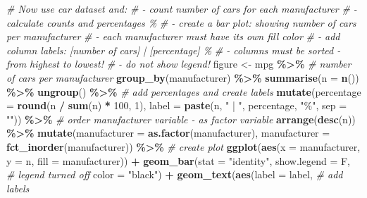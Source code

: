 \documentclass[
]{article}
\newenvironment{Shaded}{\begin{snugshade}}{\end{snugshade}}
\newcommand{\AttributeTok}[1]{\textcolor[rgb]{0.13,0.29,0.53}{#1}}
\newcommand{\CommentTok}[1]{\textcolor[rgb]{0.56,0.35,0.01}{\textit{#1}}}
\newcommand{\DecValTok}[1]{\textcolor[rgb]{0.00,0.00,0.81}{#1}}
\newcommand{\FunctionTok}[1]{\textcolor[rgb]{0.13,0.29,0.53}{\textbf{#1}}}
\newcommand{\NormalTok}[1]{#1}
\newcommand{\OtherTok}[1]{\textcolor[rgb]{0.56,0.35,0.01}{#1}}
\newcommand{\SpecialCharTok}[1]{\textcolor[rgb]{0.81,0.36,0.00}{\textbf{#1}}}
\newcommand{\StringTok}[1]{\textcolor[rgb]{0.31,0.60,0.02}{#1}}
\begin{document}
\begin{Shaded}
\begin{Highlighting}[]
\CommentTok{\# Now use car dataset and:}
\CommentTok{\#  {-} count number of cars for each manufacturer}
\CommentTok{\#  {-} calculate counts and percentages \%}
\CommentTok{\#  {-} create a bar plot: showing number of cars per manufacturer}
\CommentTok{\#  {-} each manufacturer must have its own fill color}
\CommentTok{\#  {-} add column labels: [number of cars]  | [percentage] \%}
\CommentTok{\#  {-} columns must be sorted {-} from highest to lowest!}
\CommentTok{\#  {-} do not show legend!}
\NormalTok{figure }\OtherTok{\textless{}{-}}\NormalTok{ mpg }\SpecialCharTok{\%\textgreater{}\%} 
  \CommentTok{\# number of cars per manufacturer}
  \FunctionTok{group\_by}\NormalTok{(manufacturer) }\SpecialCharTok{\%\textgreater{}\%} 
  \FunctionTok{summarise}\NormalTok{(}\AttributeTok{n =} \FunctionTok{n}\NormalTok{()) }\SpecialCharTok{\%\textgreater{}\%} 
  \FunctionTok{ungroup}\NormalTok{() }\SpecialCharTok{\%\textgreater{}\%} 
  \CommentTok{\# add percentages and create labels}
  \FunctionTok{mutate}\NormalTok{(}\AttributeTok{percentage =} \FunctionTok{round}\NormalTok{(n }\SpecialCharTok{/} \FunctionTok{sum}\NormalTok{(n) }\SpecialCharTok{*} \DecValTok{100}\NormalTok{, }\DecValTok{1}\NormalTok{),}
         \AttributeTok{label =} \FunctionTok{paste}\NormalTok{(n, }\StringTok{" | "}\NormalTok{, percentage, }\StringTok{"\%"}\NormalTok{, }\AttributeTok{sep =} \StringTok{""}\NormalTok{)) }\SpecialCharTok{\%\textgreater{}\%} 
  \CommentTok{\# order manufacturer variable {-} as factor variable}
  \FunctionTok{arrange}\NormalTok{(}\FunctionTok{desc}\NormalTok{(n)) }\SpecialCharTok{\%\textgreater{}\%} 
  \FunctionTok{mutate}\NormalTok{(}\AttributeTok{manufacturer =} \FunctionTok{as.factor}\NormalTok{(manufacturer),}
         \AttributeTok{manufacturer =} \FunctionTok{fct\_inorder}\NormalTok{(manufacturer)) }\SpecialCharTok{\%\textgreater{}\%} 
  \CommentTok{\# create plot}
  \FunctionTok{ggplot}\NormalTok{(}\FunctionTok{aes}\NormalTok{(}\AttributeTok{x =}\NormalTok{ manufacturer,}
             \AttributeTok{y =}\NormalTok{ n,}
             \AttributeTok{fill =}\NormalTok{ manufacturer)) }\SpecialCharTok{+}
  \FunctionTok{geom\_bar}\NormalTok{(}\AttributeTok{stat =} \StringTok{"identity"}\NormalTok{, }
           \AttributeTok{show.legend =}\NormalTok{ F,    }\CommentTok{\# legend turned off}
           \AttributeTok{color =} \StringTok{"black"}\NormalTok{) }\SpecialCharTok{+}  
  \FunctionTok{geom\_text}\NormalTok{(}\FunctionTok{aes}\NormalTok{(}\AttributeTok{label =}\NormalTok{ label, }\CommentTok{\# add labels}

\end{Highlighting}
\end{Shaded}
\end{document}
